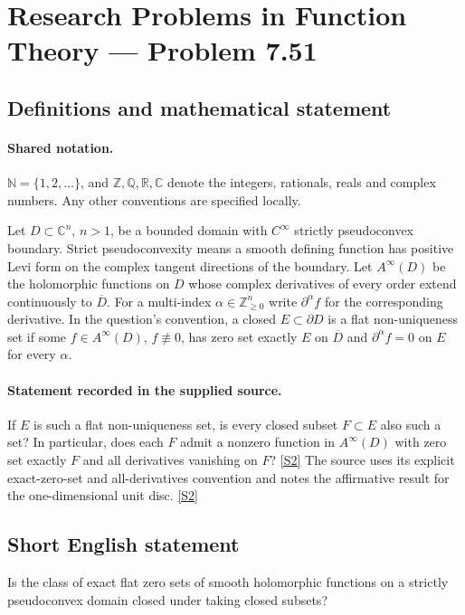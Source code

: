 \documentclass[11pt]{article}
\newcommand{\sref}[2]{\hyperlink{source:#1:#2}{[S#2]}}
\begin{document}
\section{Research Problems in Function Theory — Problem 7.51}\label{statement}

\subsection{Definitions and mathematical statement}

\paragraph{Shared notation.}$\mathbb N=\{1,2,\ldots\}$, and $\mathbb Z,\mathbb Q,\mathbb R,\mathbb C$ denote the integers, rationals, reals and complex numbers. Any other conventions are specified locally.


Let $D\subset\mathbb C^n$, $n>1$, be a bounded domain with $C^\infty$ strictly pseudoconvex boundary. Strict pseudoconvexity means a smooth defining function has positive Levi form on the complex tangent directions of the boundary. Let $A^\infty(D)$ be the holomorphic functions on $D$ whose complex derivatives of every order extend continuously to $\overline D$. For a multi-index $\alpha\in\mathbb Z_{\ge0}^n$ write $\partial^\alpha f$ for the corresponding derivative. In the question's convention, a closed $E\subset\partial D$ is a flat non-uniqueness set if some $f\in A^\infty(D)$, $f\not\equiv0$, has zero set exactly $E$ on $\overline D$ and $\partial^\alpha f=0$ on $E$ for every $\alpha$.

\paragraph{Statement recorded in the supplied source.}
If $E$ is such a flat non-uniqueness set, is every closed subset $F\subset E$ also such a set? In particular, does each $F$ admit a nonzero function in $A^\infty(D)$ with zero set exactly $F$ and all derivatives vanishing on $F$? \sref{statement}{2}
The source uses its explicit exact-zero-set and all-derivatives convention and notes the affirmative result for the one-dimensional unit disc. \sref{statement}{2}
\subsection{Short English statement}
Is the class of exact flat zero sets of smooth holomorphic functions on a strictly pseudoconvex domain closed under taking closed subsets?
\end{document}
